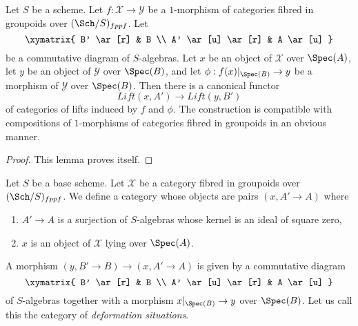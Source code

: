 \begin{lemma}
\label{lemma-functoriality}
Let $S$ be a scheme. Let $f : \mathcal{X} \to \mathcal{Y}$ be a $1$-morphism
of categories fibred in groupoids over $(\Sch/S)_{fppf}$. Let
$$
\xymatrix{
B' \ar[r] & B \\
A' \ar[u] \ar[r] & A \ar[u]
}
$$
be a commutative diagram of $S$-algebras. Let $x$ be an object of $\mathcal{X}$
over $\Spec(A)$, let $y$ be an object of $\mathcal{Y}$ over $\Spec(B)$,
and let $\phi : f(x)|_{\Spec(B)} \to y$ be a morphism of $\mathcal{Y}$
over $\Spec(B)$. Then there is a canonical functor
$$
\textit{Lift}(x, A') \longrightarrow \textit{Lift}(y, B')
$$
of categories of lifts induced by $f$ and $\phi$. The construction is
compatible with compositions of $1$-morphisms of categories fibred in
groupoids in an obvious manner.
\end{lemma}

\begin{proof}
This lemma proves itself.
\end{proof}

\noindent
Let $S$ be a base scheme. Let $\mathcal{X}$ be a category fibred
in groupoids over $(\Sch/S)_{fppf}$. We define a category whose objects are
pairs $(x, A' \to A)$ where
\begin{enumerate}
\item $A' \to A$ is a surjection of $S$-algebras whose kernel
is an ideal of square zero,
\item $x$ is an object of $\mathcal{X}$ lying over $\Spec(A)$.
\end{enumerate}
A morphism $(y, B' \to B) \to (x, A' \to A)$ is given by a commutative
diagram
$$
\xymatrix{
B' \ar[r] & B \\
A' \ar[u] \ar[r] & A \ar[u]
}
$$
of $S$-algebras together with a morphism $x|_{\Spec(B)} \to y$ over
$\Spec(B)$. Let us call this the category of {\it deformation situations}.

